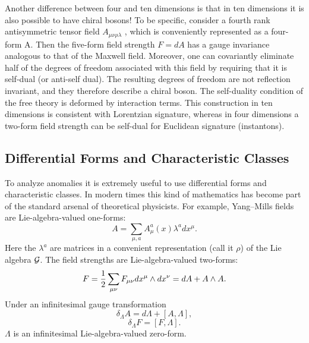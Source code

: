 \documentclass[a4paper,12pt]{article}
\begin{document}
Another difference between four and ten dimensions is that in ten
dimensions it is also possible to have chiral bosons! To be
specific, consider a fourth rank antisymmetric tensor field
$A_{\mu\nu\rho\lambda}$ , which is conveniently represented as a
four-form A. Then the five-form field strength $F=dA$ has a gauge
invariance analogous to that of the Maxwell field.  Moreover, one
can covariantly eliminate half of the degrees of freedom
associated with this field by requiring that it is self-dual (or
anti-self dual). The resulting degrees of freedom are not
reflection invariant, and they therefore describe a chiral boson.
The self-duality condition of the free theory is deformed by interaction terms.
This construction in ten dimensions is consistent with Lorentzian
signature, whereas in four dimensions a two-form field strength
can be self-dual for Euclidean signature (instantons).

\subsection{Differential Forms and Characteristic Classes}
To analyze anomalies it is extremely useful to use differential
forms and characteristic classes. In modern times this kind of
mathematics has become part of the standard arsenal of theoretical
physicists.  For example, Yang--Mills fields are
Lie-algebra-valued one-forms:
\begin{equation}
A = \sum_{\mu, a} A^{a}_{\mu}(x) \lambda^{a} dx^{\mu}.
\end{equation}
Here the $\lambda^a$ are matrices in a convenient representation
(call it $\rho$) of the Lie algebra ${\cal G}$. The field
strengths are Lie-algebra-valued two-forms:
\begin{equation}
F = {1\over2} \sum_{\mu\nu} F_{\mu\nu} dx^{\mu} \wedge dx^{\nu} = dA + A\wedge A.
\end{equation}
Under an infinitesimal gauge transformation
\begin{equation}
\delta_{\Lambda} A = d\Lambda + [A, \Lambda],
\end{equation}
\begin{equation}
\delta_{\Lambda} F = [F, \Lambda].
\end{equation}
$\Lambda$ is an infinitesimal Lie-algebra-valued zero-form.
\end{document}
